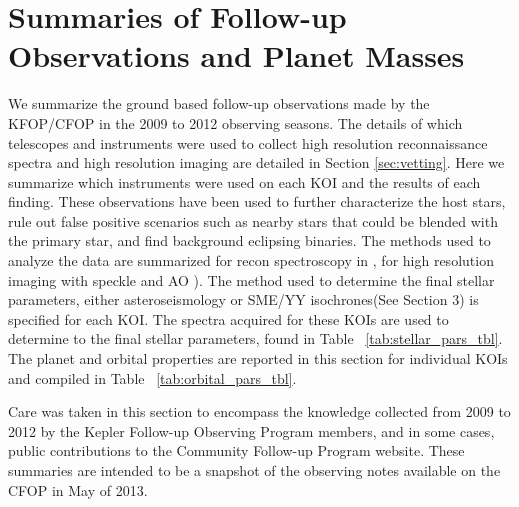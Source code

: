 \documentclass{emulateapj}
\begin{document}


\section{ Summaries of Follow-up Observations and Planet Masses}
\label{sec:obs}

We summarize the ground based follow-up observations made by the KFOP/CFOP
 \citep{Gautier2010} in the 2009 to 2012 observing seasons. The
 details of which telescopes and instruments were used to collect
 high resolution reconnaissance spectra and high resolution imaging
 are detailed in Section \ref{sec:vetting}. Here we summarize which
 instruments were used on each KOI and the results of each finding. These
 observations have been used to further characterize the host stars,
 rule out false positive scenarios such as nearby stars that could be
 blended with the primary star, and find background eclipsing
 binaries. The methods used to analyze the data are summarized for
 recon spectroscopy in \citep{Buchhave2012}, for high resolution
 imaging with speckle\citep{Howell2011} and AO \cite{Adams2012}).
 The method used to determine the final
 stellar parameters, either asteroseismology \citep{Huber2013} or
 SME/YY isochrones(See Section 3) is specified for each KOI.  
 The spectra acquired for these KOIs are used to determine to the final stellar parameters, found
 in Table ~\ref{tab:stellar_pars_tbl}. The planet and orbital properties
  are reported in this section for individual KOIs and compiled in Table
 ~\ref{tab:orbital_pars_tbl}.

Care was taken in this section to encompass the knowledge collected
 from 2009 to 2012 by the Kepler Follow-up Observing Program members,
 and in some cases, public contributions to the Community Follow-up
 Program website. These summaries are intended to be a snapshot
 of the observing notes available on the CFOP in May of 2013.

\end{document}
